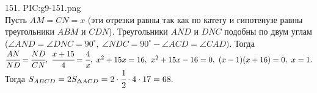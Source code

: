 151. {{PIC:g9-151.png}}\\
Пусть $AM=CN=x$ (эти отрезки равны так как по катету и гипотенузе равны треугольники $ABM$ и $CDN$). Треугольники $AND$ и $DNC$ подобны по двум  углам ($\angle AND=\angle DNC=90^\circ,\ \angle NDC=90^\circ-\angle ACD=\angle CAD).$ Тогда $\cfrac{AN}{ND}=\cfrac{ND}{CN},\ \cfrac{x+15}{4}=\cfrac{4}{x},\ x^2+15x=16,\ x^2+15x-16=0,\
(x-1)(x+16)=0,\ x=1.$ Тогда $S_{ABCD}=2S_{\Delta ACD}=2\cdot\cfrac{1}{2}\cdot4\cdot17=68.$\newpage\noindent
